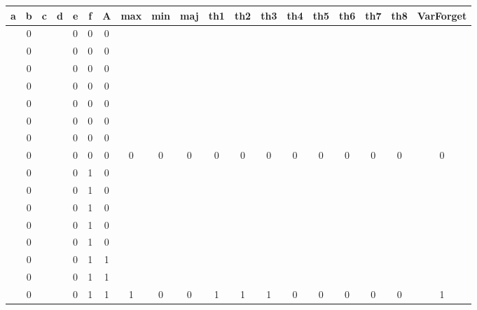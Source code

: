 \begin{table}[!tb]
    \centering
    \begin{tabular}{|c|c|c|c|c|c|c|c|c|c|c|c|c|c|c|c|c|c|c|}
        \hline
        \textbf{a} & \textbf{b} & \textbf{c} & \textbf{d} & \textbf{e} & \textbf{f} & \textbf{A} & \textbf{max} & \textbf{min} & \textbf{maj} & \textbf{th1} & \textbf{th2} & \textbf{th3} & \textbf{th4} & \textbf{th5} & \textbf{th6} & \textbf{th7} & \textbf{th8} & \textbf{VarForget} \\ \hline
        \rowcolor{gray!40}  & 0 &  &  & 0 & 0 & 0 &  &  &  &  &  &  &  &  &  &  &  &  \\ \hline
        \rowcolor{gray!40}  & 0 &  &  & 0 & 0 & 0 &  &  &  &  &  &  &  &  &  &  &  &  \\ \hline
        \rowcolor{gray!40}  & 0 &  &  & 0 & 0 & 0 &  &  &  &  &  &  &  &  &  &  &  &  \\ \hline
        \rowcolor{gray!40}  & 0 &  &  & 0 & 0 & 0 &  &  &  &  &  &  &  &  &  &  &  &  \\ \hline
        \rowcolor{gray!40}  & 0 &  &  & 0 & 0 & 0 &  &  &  &  &  &  &  &  &  &  &  &  \\ \hline
        \rowcolor{gray!40}  & 0 &  &  & 0 & 0 & 0 &  &  &  &  &  &  &  &  &  &  &  &  \\ \hline
        \rowcolor{gray!40}  & 0 &  &  & 0 & 0 & 0 &  &  &  &  &  &  &  &  &  &  &  &  \\ \hline
        \rowcolor{gray!40}  & 0 &  &  & 0 & 0 & 0 & 0 & 0 & 0 & 0 & 0 & 0 & 0 & 0 & 0 & 0 & 0 & 0 \\ \hline
        \rowcolor{blue!40}  & 0 &  &  & 0 & 1 & 0 &  &  &  &  &  &  &  &  &  &  &  &  \\ \hline
        \rowcolor{blue!40}  & 0 &  &  & 0 & 1 & 0 &  &  &  &  &  &  &  &  &  &  &  &  \\ \hline
        \rowcolor{blue!40}  & 0 &  &  & 0 & 1 & 0 &  &  &  &  &  &  &  &  &  &  &  &  \\ \hline
        \rowcolor{blue!40}  & 0 &  &  & 0 & 1 & 0 &  &  &  &  &  &  &  &  &  &  &  &  \\ \hline
        \rowcolor{blue!40}  & 0 &  &  & 0 & 1 & 0 &  &  &  &  &  &  &  &  &  &  &  &  \\ \hline
        \rowcolor{blue!40}  & 0 &  &  & 0 & 1 & 1 &  &  &  &  &  &  &  &  &  &  &  &  \\ \hline
        \rowcolor{blue!40}  & 0 &  &  & 0 & 1 & 1 &  &  &  &  &  &  &  &  &  &  &  &  \\ \hline
        \rowcolor{blue!40}  & 0 &  &  & 0 & 1 & 1 & 1 & 0 & 0 & 1 & 1 & 1 & 0 & 0 & 0 & 0 & 0 & 1 \\ \hline

\end{tabular}
\end{table}
